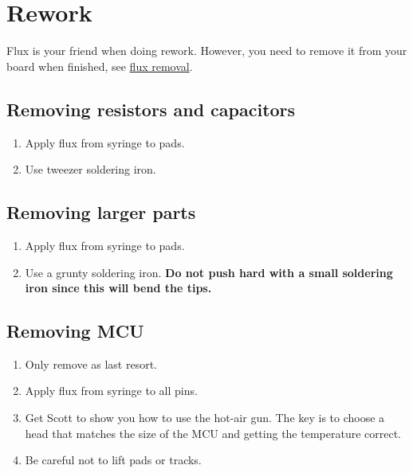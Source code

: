 \chapter{Rework}

Flux is your friend when doing rework.  However, you need to remove it
from your board when finished, see \hyperref[flux removal]{flux
  removal}.


\section{Removing resistors and capacitors}

\begin{enumerate}
\item Apply flux from syringe to pads.

\item Use tweezer soldering iron.
\end{enumerate}


\section{Removing larger parts}


\begin{enumerate}
\item Apply flux from syringe to pads.

\item Use a grunty soldering iron.  \textbf{Do not push hard with a
  small soldering iron since this will bend the tips.}
\end{enumerate}



\section{Removing MCU}

\begin{enumerate}
\item Only remove as last resort.
  
\item Apply flux from syringe to all pins.

\item Get Scott to show you how to use the hot-air gun.  The key is to
  choose a head that matches the size of the MCU and getting the
  temperature correct.

\item Be careful not to lift pads or tracks.  
\end{enumerate}



